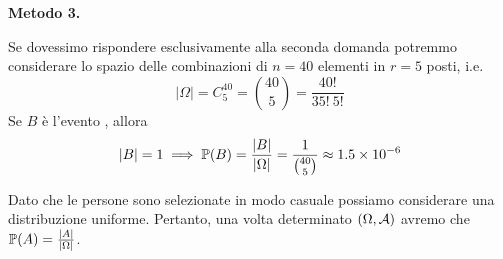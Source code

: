 \textbf{Metodo 3.}

Se dovessimo rispondere esclusivamente alla seconda domanda potremmo considerare lo spazio delle combinazioni di $n=40$ elementi in $r=5$ posti, i.e.
\begin{equation*}
	|\Omega| =C_{5}^{40} =\binom{40}{5} =\frac{40!}{35!\ 5!}
\end{equation*}
Se $B$ è l'evento , allora
\begin{equation*}
	| B| =1\implies \mathbb{P}(B) =\frac{| B| }{|\Omega| } =\frac{1}{\binom{40}{5}} \approx 1.5\times 10^{-6}
\end{equation*}

\Soluzione

Dato che le persone sono selezionate in modo casuale possiamo considerare una distribuzione uniforme. Pertanto, una volta determinato $(\Omega ,\mathcal{A})$ avremo che $\mathbb{P}(A) =\frac{| A| }{|\Omega| }$.
